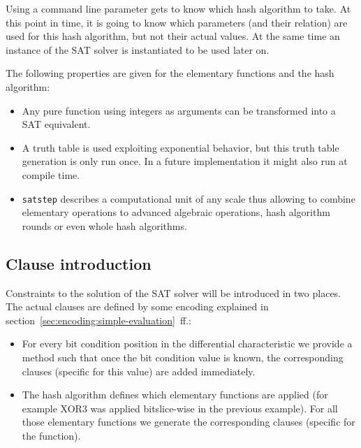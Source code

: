 Using a command line parameter \nltool{} gets to know which hash algorithm to take. At this point in time, it is going to know which parameters (and their relation) are used for this hash algorithm, but not their actual values. At the same time an instance of the SAT solver is instantiated to be used later on.

The following properties are given for the elementary functions and the hash algorithm:
\begin{itemize}
  \item Any pure function using integers as arguments can be transformed into a SAT equivalent.
  \item A truth table is used exploiting exponential behavior, but this truth table generation is only run once. In a future implementation it might also run at compile time.
  \item \texttt{satstep} describes a computational unit of any scale thus allowing to combine elementary operations to advanced algebraic operations, hash algorithm rounds or even whole hash algorithms.
\end{itemize}

\subsection{Clause introduction}
\label{sec:clause-introduction}
%
Constraints to the solution of the SAT solver will be introduced in two places. The actual clauses are defined by some encoding explained in section~\ref{sec:encoding:simple-evaluation}~ff.:
\begin{itemize}
  \item For every bit condition position in the differential characteristic we provide a method such that once the bit condition value is known, the corresponding clauses (specific for this value) are added immediately.
  \item The hash algorithm defines which elementary functions are applied (for example XOR3 was applied bitslice-wise in the previous example). For all those elementary functions we generate the corresponding clauses (specific for the function).
\end{itemize}


